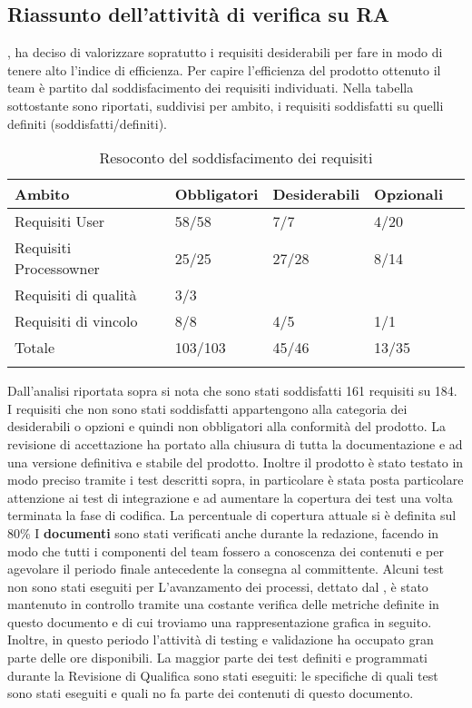 \subsection{Riassunto dell'attività di verifica su RA} 
\gruppo, ha deciso di valorizzare sopratutto i requisiti desiderabili per fare in modo di tenere alto l'indice di efficienza.
Per capire l'efficienza del prodotto ottenuto il team è partito dal soddisfacimento dei requisiti individuati.
Nella tabella sottostante sono riportati, suddivisi per ambito, i requisiti soddisfatti su quelli definiti (soddisfatti/definiti).
\begin{longtable}{lllXr}
\toprule
\textbf{Ambito} & \textbf{Obbligatori} & \textbf{Desiderabili} & \textbf{Opzionali} \\
\toprule
Requisiti User & 58/58 & 7/7 & 4/20\\
\midrule
Requisiti Processowner & 25/25 & 27/28 & 8/14\\
\midrule
Requisiti di qualità & 3/3 &  & \\
\midrule
Requisiti di vincolo & 8/8 & 4/5 & 1/1\\
\midrule
Totale & 103/103 & 45/46 & 13/35\\
\bottomrule
\caption{Resoconto del soddisfacimento dei requisiti}
\end{longtable}
Dall'analisi riportata sopra si nota che sono stati soddisfatti 161 requisiti su 184. I requisiti che non sono stati soddisfatti appartengono alla categoria dei desiderabili o opzioni e quindi non obbligatori alla conformità del prodotto.
La revisione di accettazione ha portato alla chiusura di tutta la documentazione e ad una versione definitiva e stabile del prodotto. Inoltre il prodotto è stato testato in modo preciso tramite i test descritti sopra, in particolare è stata posta particolare attenzione ai test di integrazione e ad aumentare la copertura dei test una volta terminata la fase di codifica. La percentuale di copertura attuale si è definita sul 80\%
I \textbf{documenti} sono stati verificati anche durante la redazione, facendo in modo che tutti i componenti del team fossero a conoscenza dei contenuti e per agevolare il periodo finale antecedente la consegna al committente.
Alcuni test non sono stati eseguiti per 
L'avanzamento dei processi, dettato dal \infoPDP, è stato mantenuto in controllo tramite una costante verifica delle metriche definite in questo documento e di cui troviamo una rappresentazione grafica in seguito.
Inoltre, in questo periodo l'attività di testing e validazione ha occupato gran parte delle ore disponibili. La maggior parte dei test definiti e programmati durante la Revisione di Qualifica sono stati eseguiti: le specifiche di quali test sono stati eseguiti e quali no fa parte dei contenuti di questo documento.
